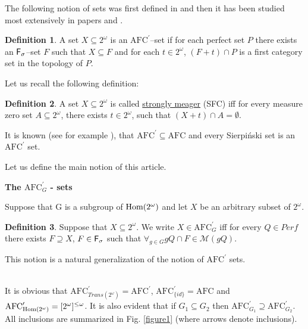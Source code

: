 \documentclass[b5cutpaper, twoside, 11pt, leqno]{moravica}
\newcommand{\afc}{\mathrm{AFC}}
\newcommand{\afcp}{\afc^\prime}
\newcommand\afcg{\afcp_{G}}
\newcommand\trans{\mathit{Trans}(\ca)}
\newcommand{\seq}{\subseteq}
\newcommand{\ca}{2^{\omega}}
\newcommand{\mgr}{\mathcal{M}}
\newcommand{\perf}{\mathit{Perf}}
\newcommand{\fsigma}{{\sf F}_{\sigma}}
\newcommand{\cantor}{\ca}
\newcommand\Hom{{\rm Hom(\ca)}}
\theoremstyle{definition}
\newtheorem{definition}{Definition}[section]
\begin{document}
  The following notion of sets was first defined in \cite{NSW}
and then it has been studied most extensively in
papers \cite{NW1} and \cite{NW2}.

\begin{definition}
  A set $X\subseteq\cantor$ is an $\afcp$--set if for each perfect
set $P$ there exists an $\fsigma$--set $F$ such that $X\subseteq F$
and for each $t\in\cantor$, $(F + t)\cap P$ is a first
category set in the topology of $P$.
\end{definition}

  Let us recall the following definition:
\begin{definition}
  A set $X\seq\ca$ is called \underline{strongly meager}
(SFC) iff for every measure zero set $A\seq\ca$, there exists $t\in\ca$,
such that $(X + t) \cap A = \emptyset$.
\end{definition}

  It is known (see for example \cite{NSW}),
that $\afcp \seq \afc$ and every Sierpi\'nski set is an $\afcp$ set.

  Let us define the main notion of this article.

\bigskip

{\bf The $\afcg$ - sets}


Suppose that G is a subgroup of $\Hom$
and let $X$ be an arbitrary subset of $\cantor$.

\begin{definition}
\label{afcg}
Suppose that $X \subseteq \cantor$.
We write $X \in \afcg$ iff
for every $Q \in \perf$ there
exists $F \supseteq X$, $F\in \fsigma$
such that
$\forall_{g\in G} gQ \cap F \in \mgr(gQ)$.
\end{definition}

  This notion is a natural generalization
of the notion of $\afcp$ sets.

 \\

  It is obvious that $\afcp_{\trans} = \afcp$,
$\afcp_{\lbrace id \rbrace} = \afc$
and $\afcp_{\Hom} = [\cantor]^{\leq \omega}$.
  It is also evident that if $G_1 \seq G_2$ then
$\afcp_{G_1} \supseteq \afcp_{G_2}$.
  All inclusions are summarized in Fig. \ref{figure1}
(where arrows denote inclusions).
\end{document}
